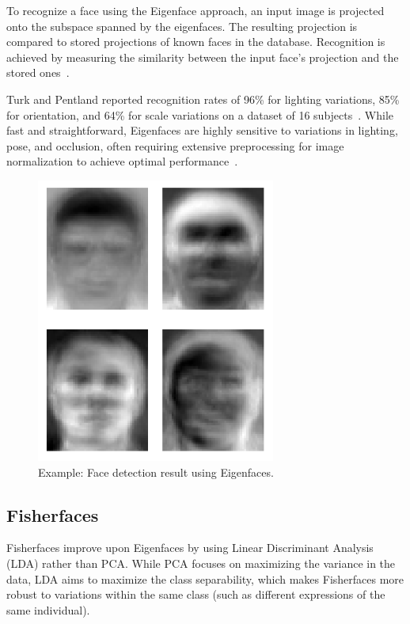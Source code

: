 To recognize a face using the Eigenface approach, an input image is projected onto the subspace spanned by the eigenfaces. The resulting projection is compared to stored projections of known faces in the database. Recognition is achieved by measuring the similarity between the input face's projection and the stored ones~\cite{alochana_study_2025}.

Turk and Pentland reported recognition rates of 96\% for lighting variations, 85\% for orientation, and 64\% for scale variations on a dataset of 16 subjects~\cite{turk1991eigenfaces}. While fast and straightforward, Eigenfaces are highly sensitive to variations in lighting, pose, and occlusion, often requiring extensive preprocessing for image normalization to achieve optimal performance~\cite{alochana_study_2025, geeksforgeeks_ml_2021}.

\begin{figure}[ht!]
    \centering
    \includegraphics[width=0.7\textwidth]{../Files/eigenfaces.png}
    \caption{Example: Face detection result using Eigenfaces.}
    \label{fig:eigenfaces-example}
\end{figure}

\subsection{Fisherfaces}
Fisherfaces improve upon Eigenfaces by using Linear Discriminant Analysis (LDA) rather than PCA\cite{belhumeur1997fisherfaces}. While PCA focuses on maximizing the variance in the data, LDA aims to maximize the class separability, which makes Fisherfaces more robust to variations within the same class (such as different expressions of the same individual).

